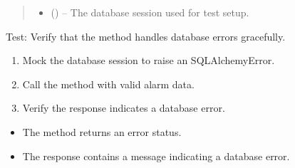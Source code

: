\documentclass[letterpaper,10pt,english]{sphinxmanual}
\begin{document}
\begin{fulllineitems}
\begin{quote}
\begin{description}
\begin{itemize}
\item {} 
\sphinxAtStartPar
{} () – The database session used for test setup.

\end{itemize}

\end{description}\end{quote}

\end{fulllineitems}


\begin{fulllineitems}
\label{\detokenize{test:test.test_alarm.test_create_alarm_level_database_error}}
\pysigstartsignatures
\pysiglinewithargsret
{}
{\sphinxparamcomma {}}
{}
\pysigstopsignatures
\sphinxAtStartPar
Test: Verify that the method handles database errors gracefully.
\begin{description}
\begin{enumerate}
%
\item {} 
\sphinxAtStartPar
Mock the database session to raise an SQLAlchemyError.

\item {} 
\sphinxAtStartPar
Call the  method with valid alarm data.

\item {} 
\sphinxAtStartPar
Verify the response indicates a database error.

\end{enumerate}

\begin{itemize}
\item {} 
\sphinxAtStartPar
The method returns an error status.

\item {} 
\sphinxAtStartPar
The response contains a message indicating a database error.

\end{itemize}

\end{description}

\end{fulllineitems}
\end{document}
